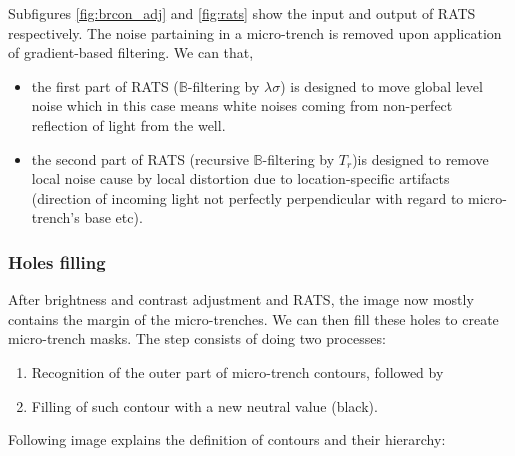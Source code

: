 \documentclass[pdftex,12pt,a4paper]{report}
\begin{document}
Subfigures \ref{fig:brcon_adj} and \ref{fig:rats} show the input and output of  RATS respectively. The noise partaining in a micro-trench is removed upon application of gradient-based filtering. We can that,

\begin{itemize}
\item the first part of RATS ($\mathbb{B}$-filtering by $\lambda \sigma$) is designed to move global level noise  which in this case means white noises coming from non-perfect reflection of light from the well.
\item the second part of RATS (recursive $\mathbb{B}$-filtering by $T_r$)is designed to remove local noise cause by local distortion due to location-specific artifacts (direction of incoming light not perfectly perpendicular with regard to micro-trench's base etc).
\end{itemize}

\subsubsection*{Holes filling}

After brightness and contrast adjustment and RATS, the image now mostly contains the margin of the micro-trenches. We can then fill these holes to create micro-trench masks. The step consists of doing two processes:

\begin{enumerate}
\item Recognition of the outer part of micro-trench contours, followed by
\item Filling of such contour with a new neutral value (black).
\end{enumerate}

Following image explains the definition of contours and their hierarchy:
\end{document}
